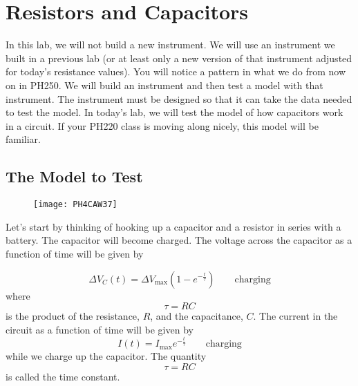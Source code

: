 \chapter{Resistors and Capacitors}
In this lab, we will not build a new instrument. We will use an instrument
we built in a previous lab (or at least only a new version of that
instrument adjusted for today's resistance values). You will notice a
pattern in what we do from now on in PH250. We will build an instrument and
then test a model with that instrument. The instrument must be designed so
that it can take the data needed to test the model. In today's lab, we will
test the model of how capacitors work in a circuit. If your PH220 class is
moving along nicely, this model will be familiar.

\section{The Model to Test}

\begin{figure}[h!]
\texttt{[image: PH4CAW37]}
\end{figure}

Let's start by thinking of hooking up a capacitor and a resistor in series
with a battery. The capacitor will become charged. The voltage across the
capacitor as a function of time will be given by

\begin{equation*}
\Delta V_{C}\left( t\right) =\Delta V_{\max }\left( 1-e^{-\frac{t}{\tau }%
}\right) \qquad \text{charging}
\end{equation*}%
where 
\begin{equation}
\tau =RC
\end{equation}%
is the product of the resistance, $R$, and the capacitance, $C.$ The current
in the circuit as a function of time will be given by%
\begin{equation*}
I\left( t\right) =I_{\max }e^{-\frac{t}{\tau }}\qquad \text{charging}
\end{equation*}%
while we charge up the capacitor. The quantity 
\begin{equation*}
\tau =RC
\end{equation*}%
is called the time constant.

